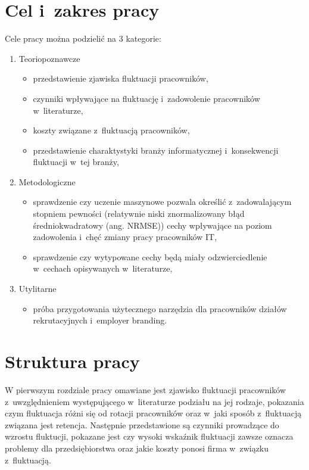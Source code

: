 \section*{Cel i~zakres pracy}\label{sec:admission:thesis-goal}

Cele pracy można podzielić na 3 kategorie:
\begin{enumerate}
    \item Teoriopoznawcze
    \begin{itemize}
        \item przedstawienie zjawiska fluktuacji pracowników,
        \item czynniki wpływające na fluktuację i~zadowolenie pracowników w~literaturze,
        \item koszty związane z~fluktuacją pracowników,
        \item przedstawienie charaktystyki branży informatycznej i~konsekwencji fluktuacji w~tej branży,
    \end{itemize}
    \item Metodologiczne
    \begin{itemize}
        \item sprawdzenie czy uczenie maszynowe pozwala określić z~zadowalającym stopniem pewności (relatywnie niski znormalizowany błąd średniokwadratowy (ang. NRMSE)) cechy wpływające na poziom zadowolenia i~chęć zmiany pracy pracowników IT,
        \item sprawdzenie czy wytypowane cechy będą miały odzwierciedlenie w~cechach opisywanych w~literaturze,
    \end{itemize}
    \item Utylitarne
    \begin{itemize}
        \item próba przygotowania użytecznego narzędzia dla pracowników działów rekrutacyjnych i~employer branding.
    \end{itemize}
\end{enumerate}

\section*{Struktura pracy}\label{sec:admission:thesis-structure}

W pierwszym rozdziale pracy omawiane jest zjawisko fluktuacji pracowników z~uwzględnieniem występującego w~literaturze podziału na jej rodzaje,
pokazania czym fluktuacja różni się od rotacji pracowników oraz w~jaki sposób z~fluktuacją związana jest retencja.
Następnie przedstawione są czynniki prowadzące do wzrostu fluktucji, pokazane jest czy wysoki wskaźnik fluktuacji zawsze oznacza problemy dla przedsiębiorstwa
oraz jakie koszty ponosi firma w~związku z~fluktuacją.

